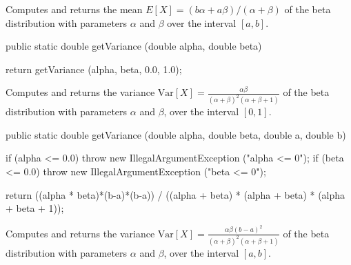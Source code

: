 \begin{tabb}  Computes and returns the mean
   $E[X] = (b\alpha + a\beta)/ (\alpha + \beta)$
   of the beta distribution with parameters $\alpha$ and $\beta$ over the
    interval $[a, b]$.
\end{tabb}
\begin{htmlonly}
\end{htmlonly}
\begin{code}

   public static double getVariance (double alpha, double beta)\begin{hide} {
      return getVariance (alpha, beta, 0.0, 1.0);
   }\end{hide}
\end{code}
\begin{tabb}  Computes and returns the variance
   $\mbox{Var}[X] = \frac{\alpha\beta}{(\alpha + \beta)^2 (\alpha + \beta + 1)}$
   of the beta distribution with parameters $\alpha$ and $\beta$, over the
    interval $[0, 1]$.
\end{tabb}
\begin{htmlonly}
\end{htmlonly}
\begin{code}

   public static double getVariance (double alpha, double beta, double a,
                                     double b) \begin{hide} {
      if (alpha <= 0.0)
         throw new IllegalArgumentException ("alpha <= 0");
      if (beta <= 0.0)
         throw new IllegalArgumentException ("beta <= 0");

      return ((alpha * beta)*(b-a)*(b-a)) /
              ((alpha + beta) * (alpha + beta) * (alpha + beta + 1));
   }\end{hide}
\end{code}
\begin{tabb}  Computes and returns the variance
   $\mbox{Var}[X] = \frac{\alpha\beta(b-a)^2}
                         {(\alpha + \beta)^2 (\alpha + \beta + 1)}$
   of the beta distribution with parameters $\alpha$ and $\beta$, over the
    interval $[a, b]$.
\end{tabb}
\begin{htmlonly}
\end{htmlonly}
